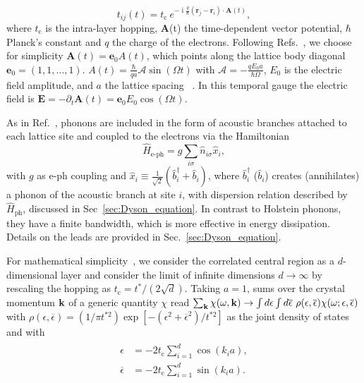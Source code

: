\documentclass[aps,prb,groupedaddress,showpacs,twocolumn,superscriptaddress,10pt]{revtex4-2}
\DeclareMathOperator*{\ii}{i} %
\renewcommand{\vec}[1]{\bm{#1}} %
\newcommand{\aamp}{\mathcal{A}}
\begin{document}
\begin{equation}\label{eq:peierls} 
t_{ij}(t) = t_{\text{c}} \ e^{-\ii \frac{q}{\hbar} \left( \vec{r}_j - \vec{r}_i \right) \cdot \vec{A}(t)}, 
\end{equation}
% 
where $t_{\text{c}}$ is the intra-layer hopping, $\vec{A}$(t) the time-dependent vector potential, $\hbar$ Planck's constant and $q$ the charge of the electrons. Following Refs.~\cite{ts.ok.08,mu.we.18}, we choose for simplicity
 $\vec{A}(t)=\vec{e}_{0} A(t)$, which points along the 
lattice body diagonal $\vec{e}_{0}=(1,1,\dots,1)$.  $A(t)=\frac{\hbar}{qa}\aamp\sin(\Omega t)$ with $\aamp=-\frac{qE_0a}{\hbar\Omega}$,  $E_0$ is the  electric field amplitude, and $a$ the lattice spacing ~\cite{ts.ok.08}. 
In this temporal gauge the electric field is $\vec{E}= -\partial_{t}\vec{A}(t) = \vec{e}_{0}E_0 \cos(\Omega t)$.
   
As in Ref.~\cite{ma.ga.22u}, phonons are included in the form of acoustic  branches attached to each lattice site and coupled to the electrons via the Hamiltonian 
\begin{equation}\label{eq:e-ph_ham} 
\hat{H}_{\text{e-ph}} = g \sum_{i\sigma} \hat{n}_{i\sigma} \hat{x}_{i},  
\end{equation}
with $g$ as e-ph coupling and $\hat{x}_{i} \equiv \frac{1}{\sqrt{2}} \left( \hat{b}^{\dagger}_{i} + \hat{b}_i \right)$, where $\hat{b}^{\dagger}_{i}$ ($\hat{b}_{i}$) creates (annihilates) a phonon of the acoustic branch at site $i$, with dispersion relation described by $\hat{H}_{\text{ph}}$, discussed in Sec~\ref{sec:Dyson_equation}. In contrast to Holstein phonons, they have a finite bandwidth, which is more effective in energy dissipation. Details on the leads are provided in Sec.~\ref{sec:Dyson_equation}.    
 
For mathematical simplicity~\cite{ge.ko.92,ao.ts.14}, 
 we consider the correlated central region as a $d$-dimensional layer and consider the limit of infinite dimensions $d \rightarrow \infty$ by rescaling the hopping as $t_{\text{c}}=t^{\ast}/(2\sqrt{d})$. Taking $a=1$, sums over the crystal momentum ${\bf k}$ of a generic quantity $\chi$ read $\sum_{{\bf k}} \chi(\omega,{\bf k}) \rightarrow \int d\epsilon \int   d\overline{\epsilon} \ \rho(\epsilon,\overline{\epsilon}) \chi(\omega;\epsilon,\overline{\epsilon})$ with $\rho(\epsilon,\overline{\epsilon}) = (1/\pi t^{\ast 2}) \exp[-( \epsilon^{2} + \overline{\epsilon}^{2})/t^{\ast 2}]$ as the joint density of states~\cite{ts.ok.08} and with
% 
\begin{align}\label{eq:d-dim_crystal_dep}
\begin{split}  
\epsilon & = -2t_{\text{c}} \sum_{i=1}^{d} \cos(k_i a), \\  
\overline{\epsilon}& = -2t_{\text{c}}\sum_{i=1}^{d} \sin(k_i a). \\
\end{split}  
\end{align}
%  
  
\end{document}
